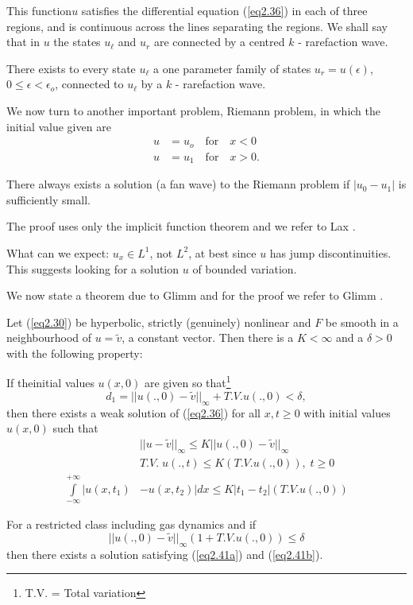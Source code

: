 This function\pageoriginale $u$ satisfies the differential equation (\ref{eq2.36}) in each of three regions, and is continuous across the lines separating the regions. We shall say that in $u$ the states $u_\ell$ and $u_r$ are connected by a centred $k$ - rarefaction wave.

\begin{thm}\label{chap2:thm2}
There exists to every state $u_\ell$ a one parameter family of states $u_r = u(\epsilon)$, $0 \leq \epsilon < \epsilon_o$, connected to $u_\ell$ by a $k$ - rarefaction wave.

We now turn to another important problem, Riemann problem, in which the initial value given are
\begin{align*}
u & = u_o \quad \text{for} \quad x < 0\\
u & = u_1 \quad \text{for} \quad x > 0.
\end{align*}
\end{thm}

\begin{thm}\label{chap2:thm3}
There always exists a solution (a fan wave) to the Riemann problem if $|u_0 - u_1|$ is sufficiently small.

The proof uses only the implicit function theorem and we refer to Lax \cite{key23}.
\end{thm}

\medskip
{}
What can we expect: $u_x \in L^1$, not $L^2$, at best since $u$ has jump discontinuities. This suggests looking for a solution $u$ of bounded variation.

We now state a theorem due to Glimm and for the proof we refer to Glimm \cite{key15}. 

\begin{thm}[Glimm]\label{chap2:thm4}
Let  (\ref{eq2.30}) be hyperbolic, strictly (genuinely) nonlinear and $F$ be smooth in a neighbourhood of $u = \tilde{v}$, a constant vector. Then there is a $K < \infty$ and a $\delta > 0$ with the following property:

If the\pageoriginale initial values $u(x,0)$ are given so that\footnote{T.V. = Total variation}
$$
d_1 = || u(., 0) - \tilde{v} ||_\infty + T.V. u(., 0) < \delta,
$$
then there exists a weak solution of (\ref{eq2.36}) for all $x, t \geq 0$ with initial values $u(x,0)$ such that
\begin{align*}
& ||u-\tilde{v}||_\infty \leq K ||u(.,0) - \tilde{v}||_\infty \tag{2.41a}\label{eq2.41a}\\
& T.V. \; u (., t) \leq K (T.V. u (., 0)), \; t \geq 0 \tag{2.41b}\label{eq2.41b}\\
 \int\limits^{+\infty}_{-\infty}  |u(x,t_1) &  - u (x,t_2)| dx \leq K | t_1 - t_2| (T.V. u (.,0)) \tag{2.41c}\label{eq2.41c}
 \end{align*}

For a restricted class including gas dynamics and if 
$$
|| u(.,0) - \tilde{v}||_\infty (1 + T.V. u (.,0)) \leq \delta
$$
then there exists a solution satisfying (\ref{eq2.41a}) and (\ref{eq2.41b}).
\end{thm}

